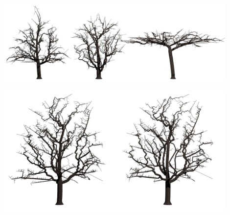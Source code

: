 \begin{center}
	\includegraphics[width=120mm]{images/renders/shape.png}
\end{center}

\begin{center}
	\includegraphics[width=120mm]{images/renders/smooth.png}
\end{center}